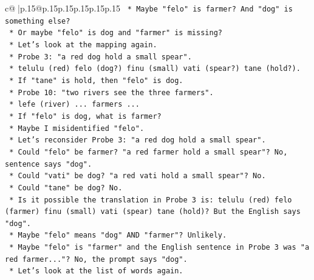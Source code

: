 \documentclass{article}
\begin{document}
{\begin{supertabular}{c@{$\;$}|p{.15\linewidth}@{}p{.15\linewidth}p{.15\linewidth}p{.15\linewidth}p{.15\linewidth}p{.15\linewidth}}
{{{\texttt{                                *   Maybe "felo" is farmer? And "dog" is something else?} \\
\texttt{                                *   Or maybe "felo" is dog and "farmer" is missing?} \\
\texttt{                                *   Let's look at the mapping again.} \\
\texttt{                                *   Probe 3: "a red dog hold a small spear".} \\
\texttt{                                    *   telulu (red) felo (dog?) finu (small) vati (spear?) tane (hold?).} \\
\texttt{                                    *   If "tane" is hold, then "felo" is dog.} \\
\texttt{                                *   Probe 10: "two rivers see the three farmers".} \\
\texttt{                                    *   lefe (river) ... farmers ...} \\
\texttt{                                    *   If "felo" is dog, what is farmer?} \\
\texttt{                                    *   Maybe I misidentified "felo".} \\
\texttt{                                    *   Let's reconsider Probe 3: "a red dog hold a small spear".} \\
\texttt{                                    *   Could "felo" be farmer? "a red farmer hold a small spear"? No, sentence says "dog".} \\
\texttt{                                    *   Could "vati" be dog? "a red vati hold a small spear"? No.} \\
\texttt{                                    *   Could "tane" be dog? No.} \\
\texttt{                                    *   Is it possible the translation in Probe 3 is: telulu (red) felo (farmer) finu (small) vati (spear) tane (hold)? But the English says "dog".} \\
\texttt{                                    *   Maybe "felo" means "dog" AND "farmer"? Unlikely.} \\
\texttt{                                    *   Maybe "felo" is "farmer" and the English sentence in Probe 3 was "a red farmer..."? No, the prompt says "dog".} \\
\texttt{                                    *   Let's look at the list of words again.} \\
}}}
\end{supertabular}}
\end{document}
